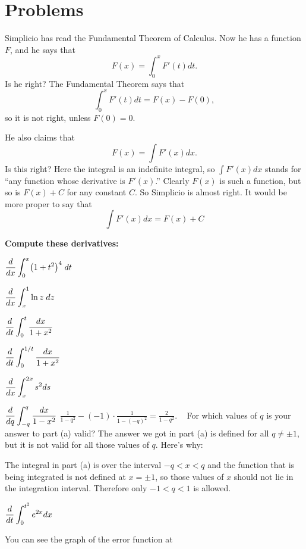 \section{Problems} %
\problemfont %
\begin{multicols}{2}%

\problem %
\subprob Simplicio has read the Fundamental Theorem of Calculus.  Now he has a
function $F$, and he says that 
\[
  F(x) = \int_0^x F'(t) dt.
\]
Is he right? 
\answer %
The Fundamental Theorem says that 
\[
   \int_0^x F'(t) dt = F(x) - F(0),
\]
so it is not right, unless $F(0)=0$.
\endanswer

\subprob He also claims that 
\[
  F(x) = \int F'(x) dx.
\]
Is this right?
\answer %
Here the integral is an indefinite integral, so $\int F'(x)dx$ stands for ``any
function whose derivative is $F'(x)$.''  Clearly $F(x)$ is such a function, but
so is $F(x) + C$ for any constant $C$.
So Simplicio is almost right.  It would be more proper to say that 
\[
  \int F'(x) dx = F(x) + C
\]
\endanswer

\noindent\textbf{Compute these derivatives:}

\problem $\displaystyle \frac d{dx} \int_0^x \bigl(1+t^2\bigr)^4 \;dt $ %

\problem $\displaystyle \frac d{dx} \int_{x}^1 \ln z\;dz$ %

\problem $\displaystyle \frac d{dt}\int_0^{t} \frac{dx}{1+x^2} $ %

\problem $\displaystyle \frac d{dt}\int_0^{1/t} \frac{dx}{1+x^2} $ %

\problem $\displaystyle \frac d{dx} \int_{x}^{2x} s^2ds$ %

\problem \subprob $\displaystyle \frac{d}{dq} \int_{-q}^q\frac{dx}{1-x^2} $ %
\answer %
$\frac{1} {1-q^2} - (-1)\cdot \frac{1} {1-(-q)^2} = \frac{2} {1-q^2}$.
\endanswer
\subprob \carefulnow~  For which values of
$q$ is your answer to part (a) valid?
\answer %
The answer we got in part (a) is defined for all $q\neq \pm1$, but it
is not valid for all those values of $q$.  Here's why:

The integral in part (a) is over the interval $-q<x<q$ and the
function that is being integrated is not defined at $x=\pm1$, so those
values of $x$ should not lie in the integration interval.  Therefore
only $-1<q<1$ is allowed.
\endanswer

\problem $\displaystyle \frac d{dt} \int_{0}^{t^2} e^{2x}dx$ %

\problem \groupproblem You can see the graph of the error function at %


\end{multicols}

